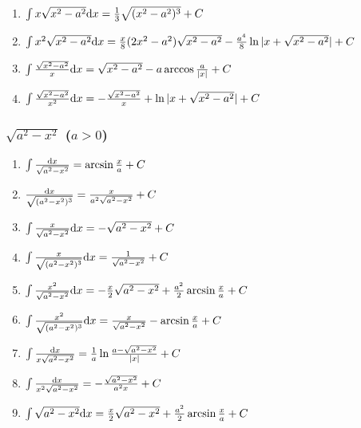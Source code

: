 \begin{tiny}
\begin{enumerate}[noitemsep]
\item $ \int x \sqrt{x^2-a^2} \mathrm{d} x = \frac{1}{3} \sqrt{(x^2-a^2)^3} + C $

\item $ \int x^2\sqrt{x^2-a^2} \mathrm{d} x = \frac{x}{8}(2x^2-a^2)\sqrt{x^2-a^2} - \frac{a^4}{8}\ln|x+\sqrt{x^2-a^2}| + C $

\item $ \int \frac{\sqrt{x^2-a^2}}{x} \mathrm{d} x = \sqrt{x^2-a^2} - a \arccos\frac{a}{|x|} + C $

\item $ \int \frac{\sqrt{x^2-a^2}}{x^2} \mathrm{d} x = -\frac{\sqrt{x^2-a^2}}{x} + \ln|x + \sqrt{x^2-a^2}| + C $

\end{enumerate}

\subsubsection{$\sqrt{a^2-x^2}$ ($a>0$)}

\begin{enumerate}[noitemsep]

\item $ \int \frac{\mathrm{d} x}{\sqrt{a^2-x^2}} = \arcsin \frac{x}{a} + C $

\item $ \frac{\mathrm{d} x}{\sqrt{(a^2-x^2)^3}} = \frac{x}{a^2\sqrt{a^2-x^2}} + C $

\item $ \int \frac{x}{\sqrt{a^2-x^2}} \mathrm{d} x = -\sqrt{a^2-x^2} + C $

\item $ \int \frac{x}{\sqrt{(a^2-x^2)^3}} \mathrm{d} x = \frac{1}{\sqrt{a^2-x^2}} + C $

\item $ \int \frac{x^2}{\sqrt{a^2-x^2}} \mathrm{d} x = -\frac{x}{2}\sqrt{a^2-x^2} + \frac{a^2}{2}\arcsin\frac{x}{a} + C $

\item $ \int \frac{x^2}{\sqrt{(a^2-x^2)^3}} \mathrm{d} x = \frac{x}{\sqrt{a^2-x^2}} - \arcsin\frac{x}{a} + C $

\item $ \int \frac{\mathrm{d} x}{x\sqrt{a^2-x^2}} = \frac{1}{a}\ln\frac{a-\sqrt{a^2-x^2}}{|x|} + C$

\item $ \int \frac{\mathrm{d} x}{x^2\sqrt{a^2-x^2}} = -\frac{\sqrt{a^2-x^2}}{a^2x} + C $

\item $ \int \sqrt{a^2-x^2}\mathrm{d} x = \frac{x}{2}\sqrt{a^2-x^2} + \frac{a^2}{2}\arcsin\frac{x}{a} + C $


\end{enumerate}
\end{tiny}
